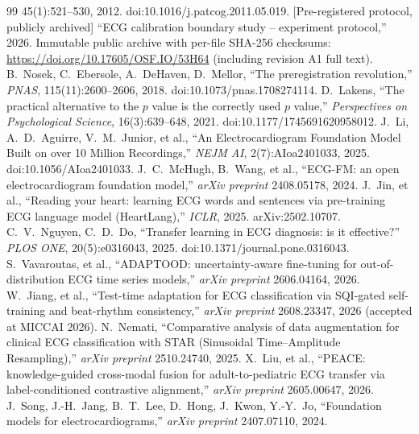 \documentclass[review,12pt,nonatbib]{elsarticle}
\begin{document}
\begin{thebibliography}{99}
45(1):521--530, 2012. doi:10.1016/j.patcog.2011.05.019.
 [Pre-registered protocol, publicly archived] ``ECG
calibration boundary study -- experiment protocol,'' 2026. Immutable
public archive with per-file SHA-256 checksums:
\url{https://doi.org/10.17605/OSF.IO/53H64} (including revision A1 full
text).
 B.~Nosek, C.~Ebersole, A.~DeHaven,
D.~Mellor, ``The preregistration revolution,'' \emph{PNAS},
115(11):2600--2606, 2018. doi:10.1073/pnas.1708274114.
 D.~Lakens, ``The practical alternative to
the $p$ value is the correctly used $p$ value,''
\emph{Perspectives on Psychological Science}, 16(3):639--648, 2021.
doi:10.1177/1745691620958012.
 J.~Li, A.~D.~Aguirre, V.~M.~Junior, et al.,
``An Electrocardiogram Foundation Model Built on over 10 Million
Recordings,'' \emph{NEJM AI},
2(7):AIoa2401033, 2025. doi:10.1056/AIoa2401033.
 J.~C.~McHugh, B.~Wang, et al., ``ECG-FM: an open
electrocardiogram foundation model,'' \emph{arXiv preprint}
2408.05178, 2024.
 J.~Jin, et al., ``Reading your heart: learning
ECG words and sentences via pre-training ECG language model
(HeartLang),'' \emph{ICLR}, 2025. arXiv:2502.10707.
 C.~V.~Nguyen, C.~D.~Do, ``Transfer learning in ECG
diagnosis: is it effective?'' \emph{PLOS ONE}, 20(5):e0316043, 2025.
doi:10.1371/journal.pone.0316043.
 S.~Vavaroutas, et al., ``ADAPTOOD:
uncertainty-aware fine-tuning for out-of-distribution ECG time series
models,'' \emph{arXiv preprint} 2606.04164, 2026.
 W.~Jiang, et al., ``Test-time adaptation for ECG
classification via SQI-gated self-training and beat-rhythm
consistency,'' \emph{arXiv preprint} 2608.23347, 2026 (accepted at
MICCAI 2026).
 N.~Nemati, ``Comparative analysis of data
augmentation for clinical ECG classification with STAR (Sinusoidal
Time--Amplitude Resampling),'' \emph{arXiv preprint} 2510.24740, 2025.
 X.~Liu, et al., ``PEACE: knowledge-guided
cross-modal fusion for adult-to-pediatric ECG transfer via
label-conditioned contrastive alignment,'' \emph{arXiv preprint}
2605.00647, 2026.
 J.~Song, J.-H.~Jang, B.~T.~Lee, D.~Hong,
J.~Kwon, Y.-Y.~Jo, ``Foundation models for electrocardiograms,''
\emph{arXiv preprint} 2407.07110, 2024.
\end{thebibliography}
\end{document}
